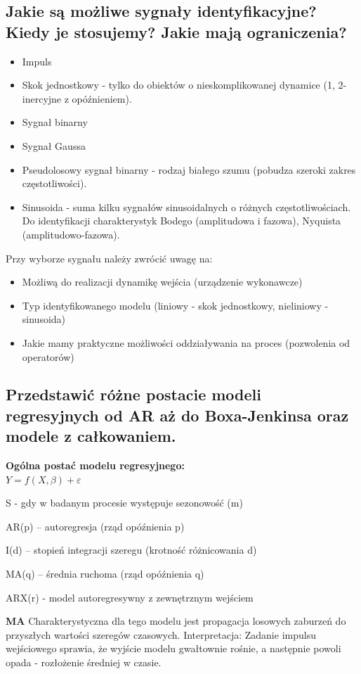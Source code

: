 \subsection{Jakie są możliwe sygnały identyfikacyjne? Kiedy je stosujemy? Jakie mają ograniczenia? }
\begin{itemize}
    \item Impuls
    \item Skok jednostkowy - tylko do obiektów o nieskomplikowanej dynamice (1, 2-inercyjne z opóźnieniem).
    \item Sygnał binarny
    \item Sygnał Gaussa
    \item Pseudolosowy sygnał binarny - rodzaj białego szumu (pobudza szeroki zakres częstotliwości).
    \item Sinusoida - suma kilku sygnałów sinusoidalnych o różnych częstotliwościach. Do identyfikacji charakterystyk Bodego (amplitudowa i fazowa), Nyquista (amplitudowo-fazowa).
\end{itemize}

Przy wyborze sygnału należy zwrócić uwagę na:
\begin{itemize}
    \item Możliwą do realizacji dynamikę wejścia (urządzenie wykonawcze)
    \item Typ identyfikowanego modelu (liniowy - skok jednostkowy, nieliniowy - sinusoida)
    \item Jakie mamy praktyczne możliwości oddziaływania na proces (pozwolenia od operatorów)
\end{itemize}

\subsection{Przedstawić różne postacie modeli regresyjnych od AR aż do Boxa-Jenkinsa oraz modele z całkowaniem.}
\label{pyt:6}
\textbf{Ogólna postać modelu regresyjnego:}\mbox{}\\
$Y=f(X,\beta)+\varepsilon$


S - gdy w badanym procesie występuje sezonowość (m)

AR(p) – autoregresja (rząd opóźnienia p)

I(d) – stopień integracji szeregu (krotność różnicowania d)

MA(q) – średnia ruchoma (rząd opóźnienia q)

ARX(r) - model autoregresywny z zewnętrznym wejściem

\textbf{MA} Charakterystyczna dla tego modelu jest propagacja losowych zaburzeń do przyszłych wartości szeregów czasowych. Interpretacja: Zadanie impulsu wejściowego sprawia, że wyjście modelu gwałtownie rośnie, a następnie powoli opada - rozłożenie średniej w czasie.

